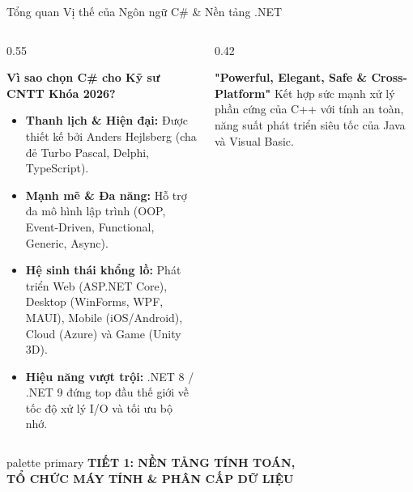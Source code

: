 \documentclass[aspectratio=169, 10pt]{beamer}
\begin{document}
\begin{frame}{Tổng quan Vị thế của Ngôn ngữ C\# \& Nền tảng .NET}
  \begin{columns}[c]
    \begin{column}{0.55\textwidth}
      \begin{block}{\textbf{Vì sao chọn C\# cho Kỹ sư CNTT Khóa 2026?}}
        \begin{itemize}
          \item \textbf{Thanh lịch \& Hiện đại:} Được thiết kế bởi Anders Hejlsberg (cha đẻ Turbo Pascal, Delphi, TypeScript).
          \item \textbf{Mạnh mẽ \& Đa năng:} Hỗ trợ đa mô hình lập trình (OOP, Event-Driven, Functional, Generic, Async).
          \item \textbf{Hệ sinh thái khổng lồ:} Phát triển Web (ASP.NET Core), Desktop (WinForms, WPF, MAUI), Mobile (iOS/Android), Cloud (Azure) và Game (Unity 3D).
          \item \textbf{Hiệu năng vượt trội:} .NET 8 / .NET 9 đứng top đầu thế giới về tốc độ xử lý I/O và tối ưu bộ nhớ.
        \end{itemize}
      \end{block}
    \end{column}
    \begin{column}{0.42\textwidth}
      \begin{tcolorbox}[colback=UniLightBlue,colframe=UniBlue,title=\textbf{Triết lý Thiết kế C\#}]
        \centering
        \textbf{\Large "Powerful, Elegant, Safe \& Cross-Platform"}
        \vskip 2mm
        \scriptsize Kết hợp sức mạnh xử lý phần cứng của C++ với tính an toàn, năng suất phát triển siêu tốc của Java và Visual Basic.
      \end{tcolorbox}
    \end{column}
  \end{columns}
\end{frame}

\begin{frame}
  \vfill
  \centering
  \begin{beamercolorbox}[sep=8pt,center,shadow=true,rounded=true]{palette primary}
    \Huge \textbf{TIẾT 1: NỀN TẢNG TÍNH TOÁN,}\\[2mm]
    \Large \textbf{TỔ CHỨC MÁY TÍNH \& PHÂN CẤP DỮ LIỆU}
  \end{beamercolorbox}
  \vfill
\end{frame}
\end{document}
